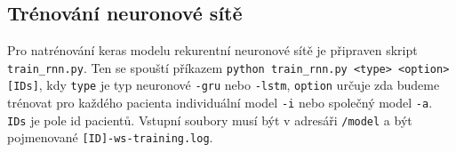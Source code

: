 \subsection*{Trénování neuronové sítě}

Pro natrénování keras modelu rekurentní neuronové sítě je připraven skript \texttt{train\_rnn.py}.  Ten se spouští příkazem \texttt{python train\_rnn.py <type> <option> [IDs]}, kdy \texttt{type} je typ neuronové \texttt{-gru} nebo \texttt{-lstm}, \texttt{option} určuje zda budeme trénovat pro každého pacienta individuální model \texttt{-i} nebo společný model \texttt{-a}. \texttt{IDs} je pole id pacientů. Vstupní soubory musí být v adresáři \texttt{/model} a být pojmenované \texttt{[ID]-ws-training.log}.